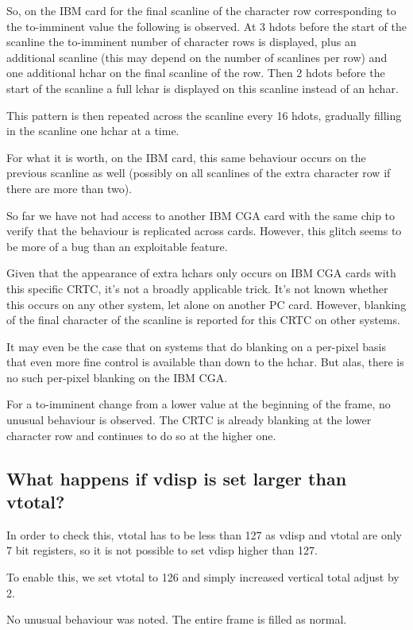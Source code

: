 \documentclass[a4paper,10pt]{amsart}
\begin{document}
So, on the IBM card for the final scanline of the character row corresponding
to the to-imminent value the following is observed. At 3 hdots before the start
of the scanline the to-imminent number of character rows is displayed, plus an
additional scanline (this may depend on the number of scanlines per row) and
one additional hchar on the final scanline of the row. Then 2 hdots before the
start of the scanline a full lchar is displayed on this scanline instead of an
hchar.

This pattern is then repeated across the scanline every 16 hdots, gradually
filling in the scanline one hchar at a time.

For what it is worth, on the IBM card, this same behaviour occurs on the
previous scanline as well (possibly on all scanlines of the extra character
row if there are more than two).

So far we have not had access to another IBM CGA card with the same chip to
verify that the behaviour is replicated across cards. However, this glitch
seems to be more of a bug than an exploitable feature.

Given that the appearance of extra hchars only occurs on IBM CGA cards with
this specific CRTC, it's not a broadly applicable trick. It's not known whether
this occurs on any other system, let alone on another PC card. However,
blanking of the final character of the scanline is reported for this CRTC on
other systems.

It may even be the case that on systems that do blanking on a per-pixel basis
that even more fine control is available than down to the hchar. But alas,
there is no such per-pixel blanking on the IBM CGA.

For a to-imminent change from a lower value at the beginning of the frame, no
unusual behaviour is observed. The CRTC is already blanking at the lower
character row and continues to do so at the higher one.

\subsection{What happens if vdisp is set larger than vtotal?}

In order to check this, vtotal has to be less than 127 as vdisp and vtotal are
only 7 bit registers, so it is not possible to set vdisp higher than 127.

To enable this, we set vtotal to 126 and simply increased vertical total adjust
by 2.

No unusual behaviour was noted. The entire frame is filled as normal.
\end{document}
